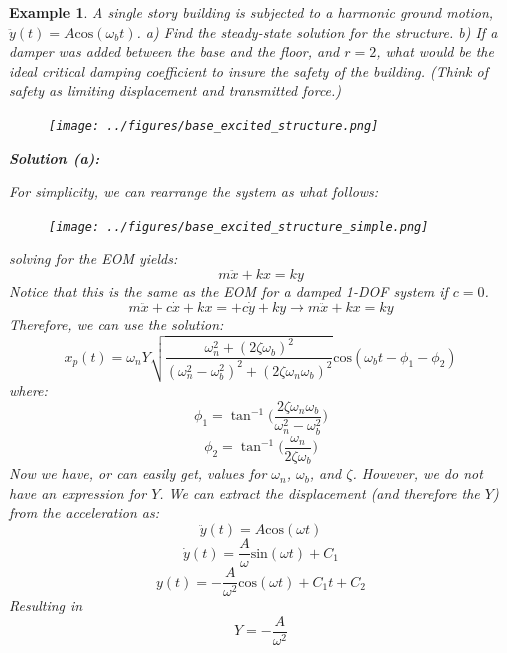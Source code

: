 \documentclass[12pt,letter]{article}
\newtheorem{ex}{Example}
\numberwithin{ex}{section} %
\newenvironment{example}{\begin{mdframed}[middlelinewidth=0.5mm]\begin{ex}\normalfont}{\end{ex}\end{mdframed}}
\numberwithin{re}{section} %
\begin{document}
				\begin{example}
		
					A single story building is subjected to a harmonic ground motion, $\ddot{y}(t) = A \text{cos}(\omega_b t)$. a) Find the steady-state solution for the structure.  b) If a damper was added between the base and the floor, and $r=2$, what would be the ideal critical damping coefficient to insure the safety of the building. (Think of safety as limiting displacement and transmitted force.) 
					\begin{figure}[H]
						\centering
						\texttt{[image: ../figures/base\_excited\_structure.png]}
					\end{figure}				
								
					\noindent\textbf{Solution (a):}
						
					For simplicity, we can rearrange the system as what follows:
					\begin{figure}[H]
						\centering
						\texttt{[image: ../figures/base\_excited\_structure\_simple.png]}
					\end{figure}			
		
					solving for the EOM yields:
					\begin{equation}
						m\ddot{x} + kx = ky
					\end{equation} 				
					Notice that this is the same as the EOM for a damped 1-DOF system if $c=0$.	
					\begin{equation}
					m\ddot{x} + c\dot{x} + kx = + c\dot{y} + ky \rightarrow m\ddot{x} + kx = ky
					\end{equation}
					Therefore, we can use the solution:
					\begin{equation}
						x_p(t) = 	\omega_n Y   \sqrt{\frac{\omega_n^2 + (2 \zeta \omega_b)^2 }{(\omega_n^2 - \omega_b^2)^2 +  (2\zeta \omega_n \omega_b)^2} }  \text{cos}(\omega_bt - \phi_1 - \phi_2)
					\end{equation}
					where:
					\begin{equation}
						\phi_1 = \tan^{-1} \bigg(\frac{2\zeta \omega_n \omega_b}{\omega_n^2 - \omega_b^2}\bigg)
					\end{equation}	
					\begin{equation}
						\phi_2 = \tan^{-1} \bigg(\frac{\omega_n}{2\zeta \omega_b}\bigg)
					\end{equation}
					Now we have, or can easily get, values for $\omega_n$, $\omega_b$, and $\zeta$. However, we do not have an expression for $Y$. We can extract the displacement (and therefore the $Y$) from the acceleration as:
					\begin{equation}
						\ddot{y}(t) = A \text{cos}(\omega t)
					\end{equation} 				
					\begin{equation}
						\dot{y}(t) = \frac{A}{\omega} \text{sin}(\omega t) + C_1
					\end{equation} 					
					\begin{equation}
						y(t) = - \frac{A}{\omega^2} \text{cos}(\omega t) + C_1t + C_2
					\end{equation} 					
					Resulting in 
					\begin{equation}
						Y = -\frac{A}{\omega^2}
					\end{equation} 			
					

\end{example}
\end{document}
